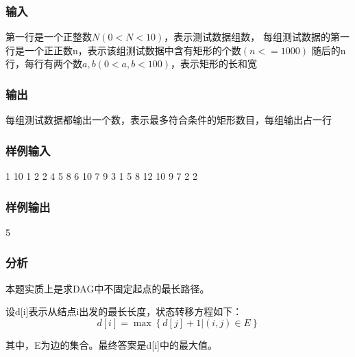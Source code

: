 \subsubsection{输入}
第一行是一个正整数$N(0<N<10)$，表示测试数据组数，
每组测试数据的第一行是一个正正数n，表示该组测试数据中含有矩形的个数$(n<=1000)$
随后的n行，每行有两个数$a,b(0<a,b<100)$，表示矩形的长和宽

\subsubsection{输出}
每组测试数据都输出一个数，表示最多符合条件的矩形数目，每组输出占一行

\subsubsection{样例输入}
\begin{Code}
1
10
1 2
2 4
5 8
6 10
7 9
3 1
5 8
12 10
9 7
2 2
\end{Code}

\subsubsection{样例输出}
\begin{Code}
5
\end{Code}

\subsubsection{分析}
本题实质上是求DAG中不固定起点的最长路径。

设d[i]表示从结点i出发的最长长度，状态转移方程如下：
$$d[i]=\max\left\{d[j]+1|(i,j) \in E\right\}$$

其中，E为边的集合。最终答案是d[i]中的最大值。

